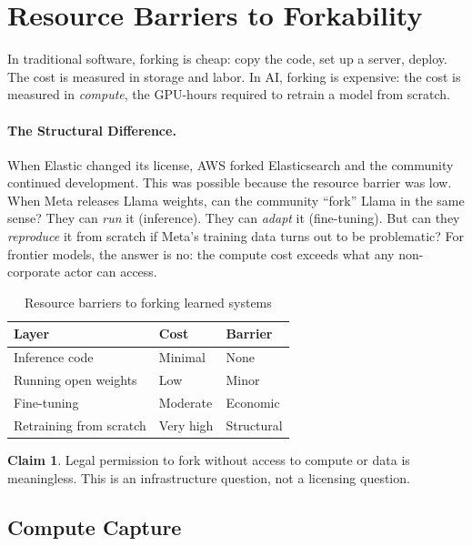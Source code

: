 \documentclass[11pt,a4paper]{article}
\theoremstyle{definition}
\newtheorem{claim}{Claim}[section]
\begin{document}

\section{Resource Barriers to Forkability}
\label{sec:fork-ai}

In traditional software, forking is cheap: copy the code, set up a server, deploy. The cost is measured in storage and labor. In AI, forking is expensive: the cost is measured in \textit{compute}, the GPU-hours required to retrain a model from scratch.

\paragraph{The Structural Difference.} When Elastic changed its license, AWS forked Elasticsearch and the community continued development. This was possible because the resource barrier was low. When Meta releases Llama weights, can the community ``fork'' Llama in the same sense? They can \textit{run} it (inference). They can \textit{adapt} it (fine-tuning). But can they \textit{reproduce} it from scratch if Meta's training data turns out to be problematic? For frontier models, the answer is no: the compute cost exceeds what any non-corporate actor can access.

\begin{table}[htbp]
\centering
\begin{tabular}{@{}lll@{}}
\toprule
\textbf{Layer} & \textbf{Cost} & \textbf{Barrier} \\
\midrule
Inference code & Minimal & None \\
Running open weights & Low & Minor \\
Fine-tuning & Moderate & Economic \\
Retraining from scratch & Very high & Structural \\
\bottomrule
\end{tabular}
\caption{Resource barriers to forking learned systems}
\label{tab:fork-barriers}
\end{table}

\begin{claim}
Legal permission to fork without access to compute or data is meaningless. This is an infrastructure question, not a licensing question.
\end{claim}

\subsection{Compute Capture}
\label{subsec:compute-capture}
\end{document}
